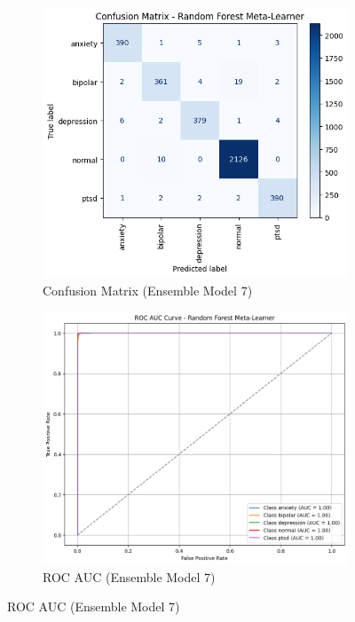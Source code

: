 \pagebreak

\begin{figure}[h!]
    \centering
    \begin{subfigure}[b]{0.48\textwidth}
        \centering
        \includegraphics[width=\textwidth]{Images/EM T CM.png}
        \caption*{Confusion Matrix (Ensemble Model 7)}
        \label{em_t cm}  %
    \end{subfigure}
    \hfill
    \begin{subfigure}[b]{0.48\textwidth}
        \centering
        \includegraphics[width=\textwidth]{Images/EM T ROC.png}
        \caption*{ROC AUC (Ensemble Model 7)}
        \label{em_t roc}  %
    \end{subfigure}
    \label{fig:ensemble_model7_comparison}
\end{figure}

